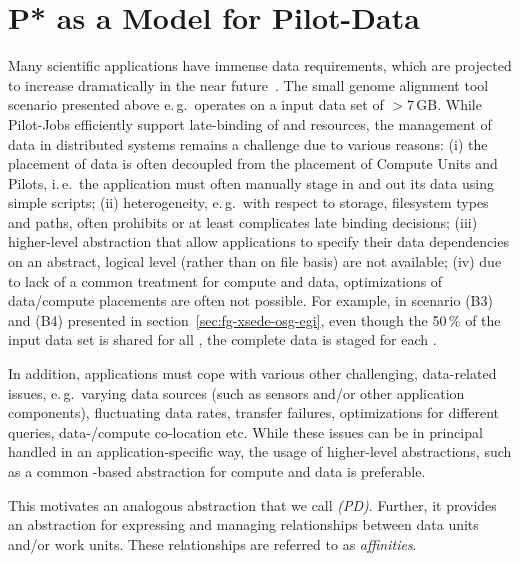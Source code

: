\documentclass{sig-alternate}
\begin{document}
\section{P* as a Model for Pilot-Data}
\label{sec:pilot-data}



Many scientific applications have immense data requirements, which are
projected to increase dramatically in the near
future~\cite{hey2009}. The small genome alignment tool
scenario presented above e.\,g.\ operates on a input data set of
$>7$\,GB. While Pilot-Jobs efficiently support late-binding of
\computeunits and resources, the management of data in distributed
systems remains a challenge due to various reasons: (i) the placement
of data is often decoupled from the placement of Compute Units and
Pilots, i.\,e.\ the application must often manually stage in and out
its data using simple scripts;  (ii) heterogeneity, e.\,g.\ with
respect to storage, filesystem types and paths, often prohibits or at
least complicates late binding decisions; (iii) higher-level
abstraction that allow applications to specify their data dependencies
on an abstract, logical level (rather than on file basis) are not
available; (iv) due to lack of a common treatment for compute and
data, optimizations of data/compute placements are often not
possible. For example, in scenario (B3) and (B4) presented in
section~\ref{sec:fg-xsede-osg-egi}, even though the 50\,\% of the
input data set is shared for all \cus, the complete data is staged for
each \cu.

In addition, applications must cope with various other challenging,
data-related issues, e.\,g.\ varying data sources (such as sensors
and/or other application components), fluctuating data rates, transfer
failures, optimizations for different queries, data-/compute
co-location etc. While these issues can be in principal handled in an
application-specific way, the usage of higher-level abstractions, such
as a common \pilot-based abstraction for compute and data is
preferable.  


This motivates an analogous abstraction that we call \emph{\pilotdata
  (PD)}.  Further, it provides an abstraction for expressing and
managing relationships between data units and/or work units. These
relationships are referred to as \emph{affinities}.
\end{document}
